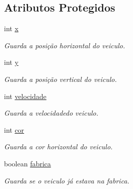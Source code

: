 \subsection*{Atributos Protegidos}
\begin{DoxyCompactItemize}
\item 
\mbox{\label{class_veiculo_a069917a284297fe5b385258b2afd9ad6}} 
int \mbox{\hyperlink{class_veiculo_a069917a284297fe5b385258b2afd9ad6}{x}}
\begin{DoxyCompactList}\small\item\em Guarda a posição horizontal do veiculo. \end{DoxyCompactList}\item 
\mbox{\label{class_veiculo_af25046404db7c2786c0d9e468bb1fb64}} 
int \mbox{\hyperlink{class_veiculo_af25046404db7c2786c0d9e468bb1fb64}{y}}
\begin{DoxyCompactList}\small\item\em Guarda a posição vertical do veiculo. \end{DoxyCompactList}\item 
\mbox{\label{class_veiculo_a2edf5e3132b1c2504c441dc095dc7e0e}} 
int \mbox{\hyperlink{class_veiculo_a2edf5e3132b1c2504c441dc095dc7e0e}{velocidade}}
\begin{DoxyCompactList}\small\item\em Guarda a velocidadedo veiculo. \end{DoxyCompactList}\item 
\mbox{\label{class_veiculo_aad500265aeb92689ca66ec5bd87787a9}} 
int \mbox{\hyperlink{class_veiculo_aad500265aeb92689ca66ec5bd87787a9}{cor}}
\begin{DoxyCompactList}\small\item\em Guarda a cor horizontal do veiculo. \end{DoxyCompactList}\item 
\mbox{\label{class_veiculo_a23d377a69bdf558ebedb5bc35dcdebf5}} 
boolean \mbox{\hyperlink{class_veiculo_a23d377a69bdf558ebedb5bc35dcdebf5}{fabrica}}
\begin{DoxyCompactList}\small\item\em Guarda se o veiculo já estava na fabrica. \end{DoxyCompactList}\end{DoxyCompactItemize}



